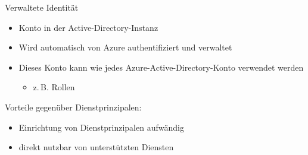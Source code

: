 \begin{flashcard}[Definition]{Verwaltete Identität}
        \begin{itemize}
            \item Konto in der Active-Directory-Instanz
            \item Wird automatisch von Azure authentifiziert und verwaltet
            \item Dieses Konto kann wie jedes Azure-Active-Directory-Konto verwendet werden
                \begin{itemize}
                    \item z.\,B. Rollen
                \end{itemize}
        \end{itemize}
        Vorteile gegenüber Dienstprinzipalen:
        \begin{itemize}
            \item Einrichtung von Dienstprinzipalen aufwändig
            \item direkt nutzbar von unterstützten Diensten
        \end{itemize}
\end{flashcard}
